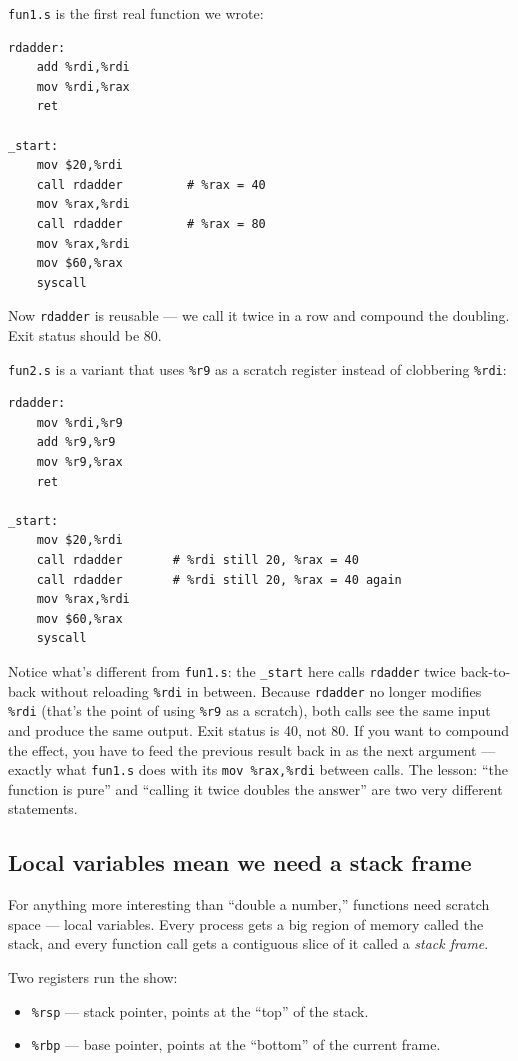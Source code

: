 \documentclass[11pt]{article}
\begin{document}
\texttt{fun1.s} is the first real function we wrote:

\begin{lstlisting}
rdadder:
    add %rdi,%rdi
    mov %rdi,%rax
    ret

_start:
    mov $20,%rdi
    call rdadder         # %rax = 40
    mov %rax,%rdi
    call rdadder         # %rax = 80
    mov %rax,%rdi
    mov $60,%rax
    syscall
\end{lstlisting}

Now \texttt{rdadder} is reusable --- we call it twice in a row and
compound the doubling. Exit status should be 80.

\texttt{fun2.s} is a variant that uses \texttt{\%r9} as a scratch
register instead of clobbering \texttt{\%rdi}:

\begin{lstlisting}
rdadder:
    mov %rdi,%r9
    add %r9,%r9
    mov %r9,%rax
    ret

_start:
    mov $20,%rdi
    call rdadder       # %rdi still 20, %rax = 40
    call rdadder       # %rdi still 20, %rax = 40 again
    mov %rax,%rdi
    mov $60,%rax
    syscall
\end{lstlisting}

Notice what's different from \texttt{fun1.s}: the \texttt{\_start}
here calls \texttt{rdadder} twice back-to-back without reloading
\texttt{\%rdi} in between. Because \texttt{rdadder} no longer
modifies \texttt{\%rdi} (that's the point of using \texttt{\%r9} as a
scratch), both calls see the same input and produce the same output.
Exit status is 40, not 80. If you want to compound the effect, you
have to feed the previous result back in as the next argument ---
exactly what \texttt{fun1.s} does with its \texttt{mov \%rax,\%rdi}
between calls. The lesson: ``the function is pure'' and ``calling it
twice doubles the answer'' are two very different statements.

\subsection*{Local variables mean we need a stack frame}

For anything more interesting than ``double a number,'' functions
need scratch space --- local variables. Every process gets a big
region of memory called the stack, and every function call gets a
contiguous slice of it called a \emph{stack frame}.

Two registers run the show:
\begin{itemize}
  \item \texttt{\%rsp} --- stack pointer, points at the ``top'' of
    the stack.
  \item \texttt{\%rbp} --- base pointer, points at the ``bottom'' of
    the current frame.
\end{itemize}
\end{document}
